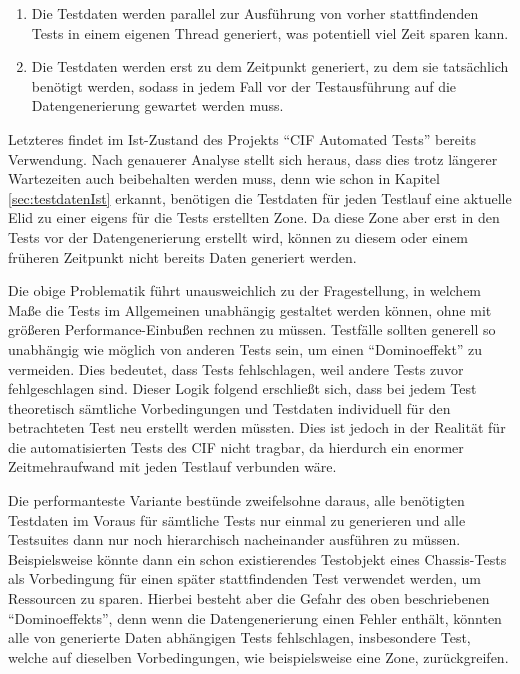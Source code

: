 \begin{enumerate}
    \item Die Testdaten werden parallel zur Ausführung von vorher stattfindenden Tests in einem eigenen Thread generiert, was potentiell viel Zeit sparen kann.
    \item Die Testdaten werden erst zu dem Zeitpunkt generiert, zu dem sie tatsächlich benötigt werden, sodass in jedem Fall vor der Testausführung auf die Datengenerierung gewartet werden muss.
\end{enumerate}

Letzteres findet im Ist-Zustand des Projekts \enquote{CIF Automated Tests} bereits Verwendung. Nach genauerer Analyse stellt sich heraus, dass dies trotz längerer Wartezeiten auch beibehalten werden muss, denn wie schon in Kapitel \ref{sec:testdatenIst} erkannt, benötigen die Testdaten für jeden Testlauf eine aktuelle \ac{Elid} zu einer eigens für die Tests erstellten Zone. Da diese Zone aber erst in den Tests vor der Datengenerierung erstellt wird, können zu diesem oder einem früheren Zeitpunkt nicht bereits Daten generiert werden.

Die obige Problematik führt unausweichlich zu der Fragestellung, in welchem Maße die Tests im Allgemeinen unabhängig gestaltet werden können, ohne mit größeren Performance-Einbußen rechnen zu müssen. Testfälle sollten generell so unabhängig wie möglich von anderen Tests sein, um einen \enquote{Dominoeffekt} zu vermeiden. Dies bedeutet, dass Tests fehlschlagen, weil andere Tests zuvor fehlgeschlagen sind. \cite[S. 197]{fewster:1999} Dieser Logik folgend erschließt sich, dass bei jedem Test theoretisch sämtliche Vorbedingungen und Testdaten individuell für den betrachteten Test neu erstellt werden müssten. Dies ist jedoch in der Realität für die automatisierten Tests des \ac{CIF} nicht tragbar, da hierdurch ein enormer Zeitmehraufwand mit jeden Testlauf verbunden wäre. 

Die performanteste Variante bestünde zweifelsohne daraus, alle benötigten Testdaten im Voraus für sämtliche Tests nur einmal zu generieren und alle Testsuites dann nur noch hierarchisch nacheinander ausführen zu müssen. Beispielsweise könnte dann ein schon existierendes Testobjekt eines Chassis-Tests als Vorbedingung für einen später stattfindenden Test verwendet werden, um Ressourcen zu sparen. Hierbei besteht aber die Gefahr des oben beschriebenen \enquote{Dominoeffekts}, denn wenn die Datengenerierung einen Fehler enthält, könnten alle von generierte Daten abhängigen Tests fehlschlagen, insbesondere Test, welche auf dieselben Vorbedingungen, wie beispielsweise eine Zone, zurückgreifen. 

